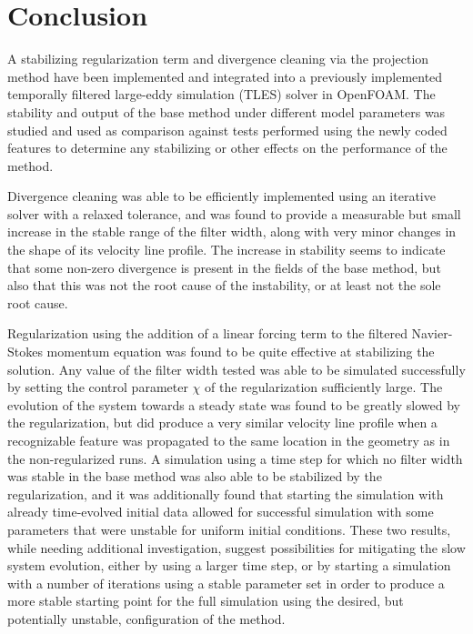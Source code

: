 \chapter{Conclusion}


A stabilizing regularization term and divergence cleaning via the projection method have been implemented and integrated into a previously implemented temporally filtered large-eddy simulation (TLES) solver in OpenFOAM. The stability and output of the base method under different model parameters was studied and used as comparison against tests performed using the newly coded features to determine any stabilizing or other effects on the performance of the method.

Divergence cleaning was able to be efficiently implemented using an iterative solver with a relaxed tolerance, and was found to provide a measurable but small increase in the stable range of the filter width, along with very minor changes in the shape of its velocity line profile. The increase in stability seems to indicate that some non-zero divergence is present in the fields of the base method, but also that this was not the root cause of the instability, or at least not the sole root cause.

Regularization using the addition of a linear forcing term to the filtered Navier-Stokes momentum equation was found to be quite effective at stabilizing the solution. Any value of the filter width tested was able to be simulated successfully by setting the control parameter $\chi$ of the regularization sufficiently large. The evolution of the system towards a steady state was found to be greatly slowed by the regularization, but did produce a very similar velocity line profile when a recognizable feature was propagated to the same location in the geometry as in the non-regularized runs. A simulation using a time step for which no filter width was stable in the base method was also able to be stabilized by the regularization, and it was additionally found that starting the simulation with already time-evolved initial data allowed for successful simulation with some parameters that were unstable for uniform initial conditions. These two results, while needing additional investigation, suggest possibilities for mitigating the slow system evolution, either by using a larger time step, or by starting a simulation with a number of iterations using a stable parameter set in order to produce a more stable starting point for the full simulation using the desired, but potentially unstable, configuration of the method.